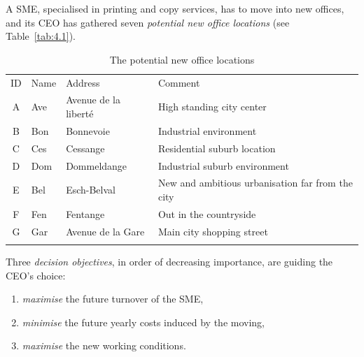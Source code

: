 A SME, specialised in printing and copy services, has to move into new offices, and its CEO has gathered seven \emph{potential new office locations} (see Table~\vref{tab:4.1}).
\begin{table}[ht]
\caption{The potential new office locations}
\label{tab:4.1}       %
\begin{center}
    \begin{tabular}{c|l|l|l}
      \svhline\noalign{\smallskip}
      ID & Name & Address & Comment\\
      \noalign{\smallskip}\hline\noalign{\smallskip}
    A &   Ave  &  Avenue de la liberté &  High standing city center\\
    B &   Bon  &  Bonnevoie &             Industrial environment\\
    C &   Ces  &  Cessange &              Residential suburb location\\
    D &   Dom  &  Dommeldange &           Industrial suburb environment\\
    E &   Bel  &  Esch-Belval &           New and ambitious urbanisation far from the city\\
    F &   Fen  &  Fentange &              Out in the countryside\\
      G &   Gar  &  Avenue de la Gare &     Main city shopping street\\
      \noalign{\smallskip}\hline
    \end{tabular}
\end{center}
\end{table}

Three \emph{decision objectives}, in order of decreasing importance, are guiding the CEO's choice:
\begin{enumerate}[leftmargin=1cm]
\item \emph{maximise} the future turnover of the SME,
\item \emph{minimise} the future yearly costs induced by the moving,
\item \emph{maximise} the new working conditions.
\end{enumerate}

